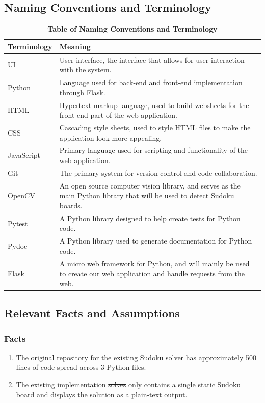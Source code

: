 \documentclass[11pt]{article}
\begin{document}
\subsection{Naming Conventions and Terminology}
\begin{table}[H]
\caption{\bf Table of Naming Conventions and Terminology}
\centering
\begin{tabularx}{\textwidth}{p{3cm}X}
\toprule
Terminology     & Meaning \\
\midrule
UI     & User interface, the interface that allows for user interaction with the system. \\
Python & Language used for back-end and front-end implementation through Flask.\\
HTML & Hypertext markup language, used to build websheets for the front-end part of the web application.\\
CSS & Cascading style sheets, used to style HTML files to make the application look more appealing.\\
JavaScript & Primary language used for scripting and functionality of the web application. \\
Git & The primary system for version control and code collaboration.\\
OpenCV & An open source computer vision library, and serves as the main Python library that will be used to detect Sudoku boards. \\
Pytest & A Python library designed to help create tests for Python code. \\
Pydoc & A Python library used to generate documentation for Python code. \\
Flask & A micro web framework for Python, and will mainly be used to create our web application and handle requests from the web.\\
\bottomrule
\end{tabularx}
\end{table}
\subsection{Relevant Facts and Assumptions}

\subsubsection{Facts}

\begin{enumerate}
    \item The original repository for the existing Sudoku solver has approximately 500 lines of code spread across 3 Python files.
    \item The existing implementation \sout{solves} only contains a single static Sudoku board and displays the solution as a plain-text output.
\end{enumerate}
\end{document}
